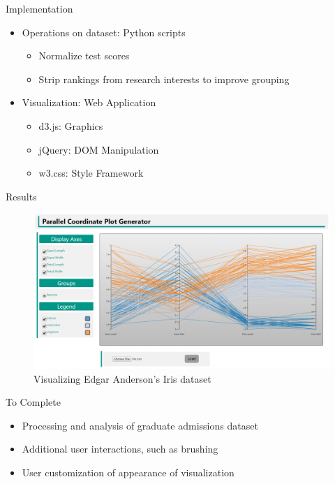 \documentclass{beamer}
\begin{document}
	\begin{frame}{Implementation}
		\begin{itemize}
			\item Operations on dataset: Python scripts
			\begin{itemize}
				\item Normalize test scores
				\item Strip rankings from research interests to improve grouping
			\end{itemize}
			\item Visualization: Web Application
			\begin{itemize}
				\item d3.js: Graphics
				\item jQuery: DOM Manipulation
				\item w3.css: Style Framework
			\end{itemize}
		\end{itemize}
	\end{frame}
	
	\begin{frame}{Results}
		\begin{figure}[h]
			\includegraphics[width=\linewidth]{results.png}
			\caption{Visualizing Edgar Anderson's Iris dataset}
			\label{fig:Result}
		\end{figure}		
	\end{frame}
	
	\begin{frame}{To Complete}
		\begin{itemize}
			\item Processing and analysis of graduate admissions dataset
			\item Additional user interactions, such as brushing
			\item User customization of appearance of visualization
		\end{itemize}
	\end{frame}
\end{document}
